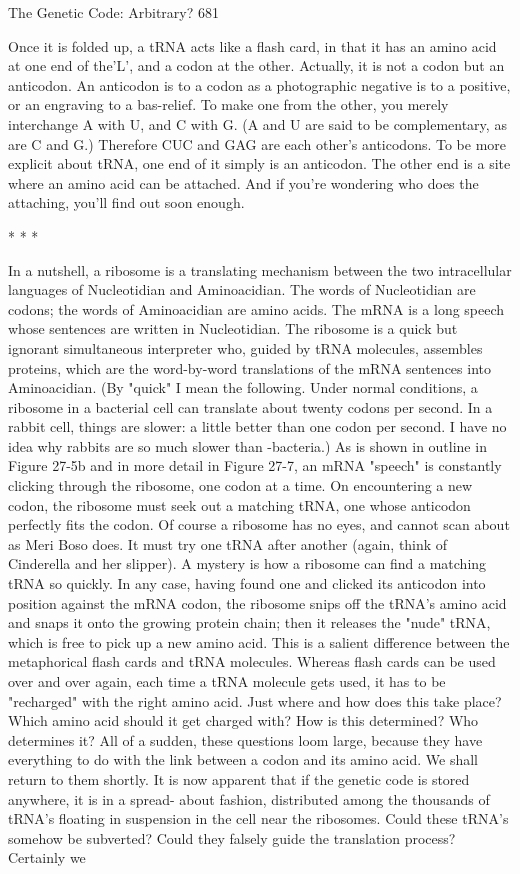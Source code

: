 The Genetic Code: Arbitrary?                                                        681

Once it is folded up, a tRNA acts like a flash card, in that it has an amino acid at one
end of the'L', and a codon at the other. Actually, it is not a codon but an anticodon. An
anticodon is to a codon as a photographic negative is to a positive, or an engraving to
a bas-relief. To make one from the other, you merely interchange A with U, and C
with G. (A and U are said to be complementary, as are C and G.) Therefore CUC and
GAG are each other's anticodons. To be more explicit about tRNA, one end of it
simply is an anticodon. The other end is a site where an amino acid can be attached.
And if you're wondering who does the attaching, you'll find out soon enough.

                                        *   *   *

         In a nutshell, a ribosome is a translating mechanism between the two
intracellular languages of Nucleotidian and Aminoacidian. The words of Nucleotidian
are codons; the words of Aminoacidian are amino acids. The mRNA is a long speech
whose sentences are written in Nucleotidian. The ribosome is a quick but ignorant
simultaneous interpreter who, guided by tRNA molecules, assembles proteins, which
are the word-by-word translations of the mRNA sentences into Aminoacidian. (By
"quick" I mean the following. Under normal conditions, a ribosome in a bacterial cell
can translate about twenty codons per second. In a rabbit cell, things are slower: a
little better than one codon per second. I have no idea why rabbits are so much slower
than -bacteria.)
         As is shown in outline in Figure 27-5b and in more detail in Figure 27-7, an
mRNA "speech" is constantly clicking through the ribosome, one codon at a time. On
encountering a new codon, the ribosome must seek out a matching tRNA, one whose
anticodon perfectly fits the codon. Of course a ribosome has no eyes, and cannot scan
about as Meri Boso does. It must try one tRNA after another (again, think of
Cinderella and her slipper). A mystery is how a ribosome can find a matching tRNA
so quickly. In any case, having found one and clicked its anticodon into position
against the mRNA codon, the ribosome snips off the tRNA's amino acid and snaps it
onto the growing protein chain; then it releases the "nude" tRNA, which is free to pick
up a new amino acid.
         This is a salient difference between the metaphorical flash cards and tRNA
molecules. Whereas flash cards can be used over and over again, each time a tRNA
molecule gets used, it has to be "recharged" with the right amino acid. Just where and
how does this take place? Which amino acid should it get charged with? How is this
determined? Who determines it? All of a sudden, these questions loom large, because
they have everything to do with the link between a codon and its amino acid. We shall
return to them shortly.
         It is now apparent that if the genetic code is stored anywhere, it is in a spread-
about fashion, distributed among the thousands of tRNA's floating in suspension in
the cell near the ribosomes. Could these tRNA's somehow be subverted? Could they
falsely guide the translation process? Certainly we




